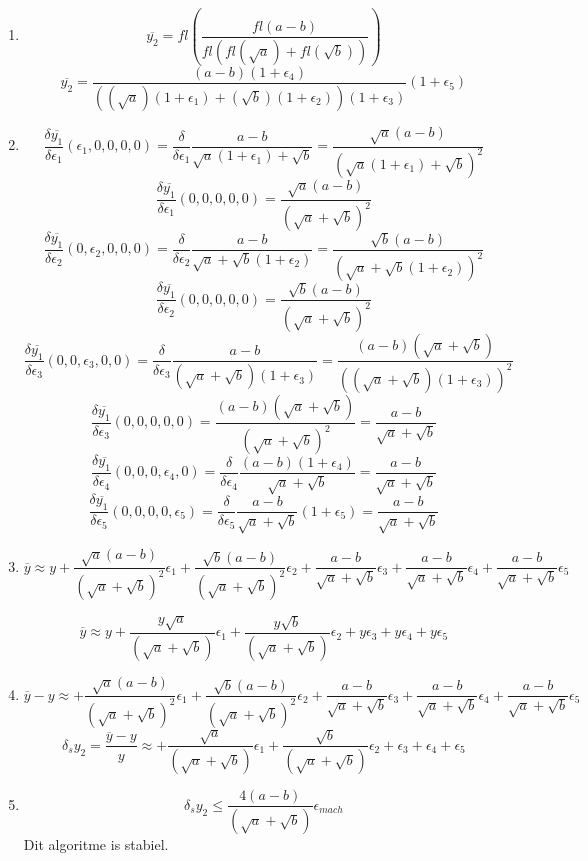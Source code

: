 \documentclass[12pt,a4paper]{article}
\begin{document}
\begin{enumerate}
\item
\[
\overline{y_2} = fl\left(\frac{fl(a-b)}{fl(fl(\sqrt{a}) + fl(\sqrt{b}))}\right)
\]
\[
\overline{y_2} =
\frac{(a-b)(1+\epsilon_4)}
{((\sqrt{a})(1+\epsilon_1) + (\sqrt{b})(1+\epsilon_2))(1+\epsilon_3)}
(1+\epsilon_5)
\]

\item
\[
\frac{\delta\overline{y_1}}{\delta\epsilon_1}(\epsilon_1,0,0,0,0)
= \frac{\delta}{\delta\epsilon_1} \frac{a-b}{\sqrt{a}(1+\epsilon_1)+\sqrt{b}}
= \frac{\sqrt{a}(a-b)}{(\sqrt{a}(1+\epsilon_1)+\sqrt{b})^2}
\]
\[
\frac{\delta\overline{y_1}}{\delta\epsilon_1}(0,0,0,0,0)
= \frac{\sqrt{a}(a-b)}{(\sqrt{a}+\sqrt{b})^2}
\]
\[
\frac{\delta\overline{y_1}}{\delta\epsilon_2}(0,\epsilon_2,0,0,0)
= \frac{\delta}{\delta\epsilon_2} \frac{a-b}{\sqrt{a}+\sqrt{b}(1+\epsilon_2)}
= \frac{\sqrt{b}(a-b)}{(\sqrt{a}+\sqrt{b}(1+\epsilon_2))^2}
\]
\[
\frac{\delta\overline{y_1}}{\delta\epsilon_2}(0,0,0,0,0)
= \frac{\sqrt{b}(a-b)}{(\sqrt{a}+\sqrt{b})^2}
\]
\[
\frac{\delta\overline{y_1}}{\delta\epsilon_3}(0,0,\epsilon_3,0,0)
= \frac{\delta}{\delta\epsilon_3} \frac{a-b}{(\sqrt{a}+\sqrt{b})(1+\epsilon_3)}
= \frac{(a-b)(\sqrt{a}+\sqrt{b})}{((\sqrt{a}+\sqrt{b})(1+\epsilon_3))^2}
\]
\[
\frac{\delta\overline{y_1}}{\delta\epsilon_3}(0,0,0,0,0)
= \frac{(a-b)(\sqrt{a}+\sqrt{b})}{(\sqrt{a}+\sqrt{b})^2}
= \frac{a-b}{\sqrt{a}+\sqrt{b}}
\]
\[
\frac{\delta\overline{y_1}}{\delta\epsilon_4}(0,0,0,\epsilon_4,0)
= \frac{\delta}{\delta\epsilon_4} \frac{(a-b)(1+\epsilon_4)}{\sqrt{a}+\sqrt{b}}
= \frac{a-b}{\sqrt{a}+\sqrt{b}}
\]
\[
\frac{\delta\overline{y_1}}{\delta\epsilon_5}(0,0,0,0,\epsilon_5)
= \frac{\delta}{\delta\epsilon_5} \frac{a-b}{\sqrt{a}+\sqrt{b}}(1+\epsilon_5)
= \frac{a-b}{\sqrt{a}+\sqrt{b}}
\]

\item
\[
\overline{y} \approx y
+ \frac{\sqrt{a}(a-b)}{(\sqrt{a}+\sqrt{b})^2}\epsilon_1
+ \frac{\sqrt{b}(a-b)}{(\sqrt{a}+\sqrt{b})^2}\epsilon_2
+ \frac{a-b}{\sqrt{a}+\sqrt{b}}\epsilon_3
+ \frac{a-b}{\sqrt{a}+\sqrt{b}}\epsilon_4
+ \frac{a-b}{\sqrt{a}+\sqrt{b}}\epsilon_5
\]

\[
\overline{y} \approx y
+ \frac{y \sqrt{a}}{(\sqrt{a}+\sqrt{b})}\epsilon_1
+ \frac{y \sqrt{b}}{(\sqrt{a}+\sqrt{b})}\epsilon_2
+ y \epsilon_3
+ y \epsilon_4
+ y \epsilon_5
\]

\item
\[
\overline{y} - y \approx
+ \frac{\sqrt{a}(a-b)}{(\sqrt{a}+\sqrt{b})^2}\epsilon_1
+ \frac{\sqrt{b}(a-b)}{(\sqrt{a}+\sqrt{b})^2}\epsilon_2
+ \frac{a-b}{\sqrt{a}+\sqrt{b}}\epsilon_3
+ \frac{a-b}{\sqrt{a}+\sqrt{b}}\epsilon_4
+ \frac{a-b}{\sqrt{a}+\sqrt{b}}\epsilon_5
\]
\[
\delta_sy_2=
\frac{\overline{y}-y}{y} \approx
+ \frac{\sqrt{a}}{(\sqrt{a}+\sqrt{b})}\epsilon_1
+ \frac{\sqrt{b}}{(\sqrt{a}+\sqrt{b})}\epsilon_2
+ \epsilon_3
+ \epsilon_4
+ \epsilon_5
\]

\item
\[
\delta_sy_2
\le \frac{4(a-b)}{(\sqrt{a}+\sqrt{b})}\epsilon_{mach}
\]
Dit algoritme is stabiel.

\end{enumerate}
\end{document}
